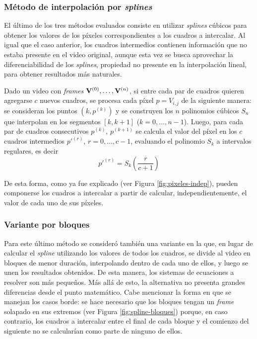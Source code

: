       \subsubsection{Método de interpolación por \emph{splines}}
        El último de los tres métodos evaluados consiste en utilizar \emph{splines} cúbicos para obtener los valores de los píxeles correspondientes a los cuadros a intercalar. Al igual que el caso anterior, los cuadros intermedios contienen información que no estaba presente en el video original, aunque esta vez se busca aprovechar la diferenciabilidad de los \emph{splines}, propiedad no presente en la interpolación lineal, para obtener resultados más naturales.

        Dado un video con \emph{frames} $\mathbf{V}^{(0)}, \dots, \mathbf{V}^{(n)}$, si entre cada par de cuadros quieren agregarse $c$ nuevos cuadros, se procesa cada píxel $p = {V}_{i,j}$ de la siguiente manera: se consideran los puntos $(k, p^{(k)})$ y se construyen los $n$ polinomios cúbicos $S_n$ que interpolan en los segmentos $[k, k+1]$ ($k = 0, \dots, n-1$). Luego, para cada par de cuadros consecutivos $p^{(k)}$, $p^{(k+1)}$ se calcula el valor del píxel en los $c$ cuadros intermedios $p'^{(r)}$, $r = 0, \dots, c-1$, evaluando el polinomio $S_k$ a intervalos regulares, es decir
        \[ p'^{(r)} = S_k \left(\frac{r}{c+1} \right) \]

        De esta forma, como ya fue explicado (ver Figura \ref{fig:pixeles-indep}), pueden componerse los cuadros a intercalar a partir de calcular, independientemente, el valor de cada uno de sus píxeles.

      \subsubsection*{Variante por bloques}

        Para este último método se consideró también una variante en la que, en lugar de calcular el \emph{spline} utilizando los valores de todos los cuadros, se divide al video en bloques de menor duración, interpolando dentro de cada uno de ellos, y luego se unen los resultados obtenidos. De esta manera, los sistemas de ecuaciones a resolver son más pequeños. Más allá de esto, la alternativa no presenta grandes diferencias desde el punto matemático. Cabe mencionar la forma en que se manejan los casos borde: se hace necesario que los bloques tengan un \emph{frame} solapado en sus extremos (ver Figura \ref{fig:spline-bloques}) porque, en caso contrario, los cuadros a intercalar entre el final de cada bloque y el comienzo del siguiente no se calcularían como parte de ninguno de ellos.

